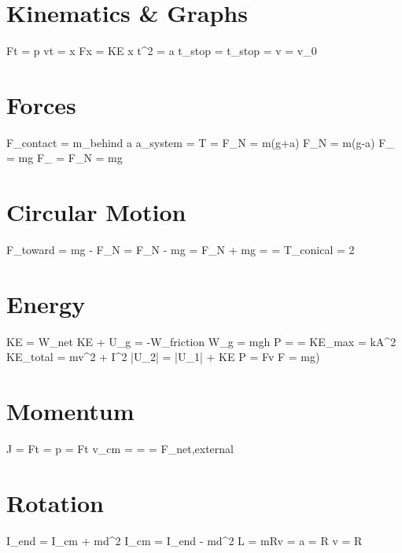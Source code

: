 \section*{Kinematics \& Graphs}
 F\text{-}t = \Delta p
 v\text{-}t = \Delta x
 F\text{-}x = \Delta KE
 \Delta x  t^2 = a
t_{stop} = 
t_{stop} =  
 v = v_0\cos\theta {}

\section*{Forces}
F_{contact} = m_{behind} \cdot a
a_{system} = 
T = 
F_N = m(g+a) 
F_N = m(g-a) 
F_{\parallel} = mg\sin\theta
F_{\perp} = F_N = mg\cos\theta

\section*{Circular Motion}
\sum F_{toward} = 
mg - F_N =  
F_N - mg =  
F_N + mg =  
\mu =  
T_{conical} = 2\pi{} 

\section*{Energy}
\Delta KE = W_{net}
\Delta KE + \Delta U_g = -W_{friction}
W_g = mgh 
P =  = 
KE_{max} = kA^2 
KE_{total} = mv^2 + I\omega^2 
|\Delta U_2| = |\Delta U_1| + \Delta KE 
P = Fv  F = \mu mg)

\section*{Momentum}
J = F\Delta t = \Delta p =  F\text{-}t
v_{cm} =  = 
 = F_{net,external}

\section*{Rotation}
I_{end} = I_{cm} + md^2
I_{cm} = I_{end} - md^2
L = mRv 
 =  
a = R\alpha
v = R\omega

